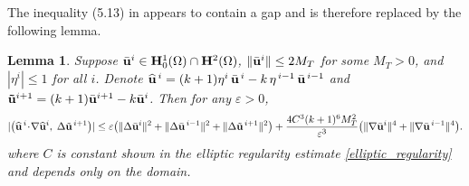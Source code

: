 \documentclass{article}
\newtheorem{lemma}[theorem]{Lemma}          %
\theoremstyle{definition}                   %
\begin{document}
The inequality (5.13) in \cite{HuangShen2023} appears to contain a gap and is therefore replaced by the following lemma.
\begin{lemma}
\label{lemma5.13-new}
Suppose $\bar{\bf u}^i\in {\bf H}^1_0(\Omega)\cap {\bf H}^2(\Omega)$,  
$\|\bar{\bf u}^{i}\| \le 2 M_T$ for some $M_T>0$, and $|\eta^i|\le 1$ for all $i$. 
Denote $\widehat {\bf u}^{\,i}=(k+1)\eta^{i}\,\bar {\bf u}^{\,i}-k\,\eta^{\,i-1}\,\bar {\bf u}^{\,i-1}$
and
${\bf \tilde{u}}^{i+1}=(k+1) {\bar{\bf u}}^{i+1} - k {\bar{\bf u}}^i$. 
Then for any $\varepsilon>0$, 
\begin{align}
|\bigl(\widehat {\bf u}^{\,i}\!\cdot\!\nabla \widehat {\bf u}^{i},\;\Delta\tilde {\bf u}^{\,i+1}\bigr)|
\le 
\varepsilon \big( \|\Delta\bar {\bf u}^i\|^2
+ \|\Delta\bar {\bf u}^{\,i-1}\|^2
+ \|\Delta\tilde {\bf u}^{\,i+1}\|^2 \big)
+  \frac{4C^3(k+1)^6 M_T^2}{\varepsilon^3} \big(\|\nabla\bar {\bf u}^i\|^4+\|\nabla\bar {\bf u}^{\,i-1}\|^4\big).
\label{5.13-new}
\end{align}
where $C$ is constant shown in the elliptic regularity estimate \eqref{elliptic_regularity} and depends only on the domain.

\end{lemma}
\end{document}
